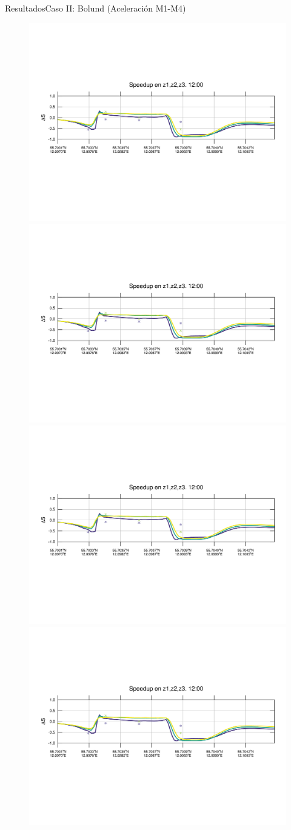 \documentclass[mathserif,10pt]{beamer}
\begin{document}
\begin{frame}{Resultados}{Caso II: Bolund (Aceleración M1-M4)}
	\begin{figure}[H]
		\centering
		\includegraphics[width=0.65\linewidth,trim={12mm 84mm 10mm 74mm},page=1,clip]{fig/06/bol/speedup}\\%
		\includegraphics[width=0.65\linewidth,trim={12mm 84mm 10mm 74mm},page=13,clip]{fig/06/bol/speedup}\\%
		\includegraphics[width=0.65\linewidth,trim={12mm 84mm 10mm 74mm},page=25,clip]{fig/06/bol/speedup}\\%
		\includegraphics[width=0.65\linewidth,trim={12mm 84mm 10mm 74mm},page=37,clip]{fig/06/bol/speedup}\\%

\end{figure}
\end{frame}
\end{document}
